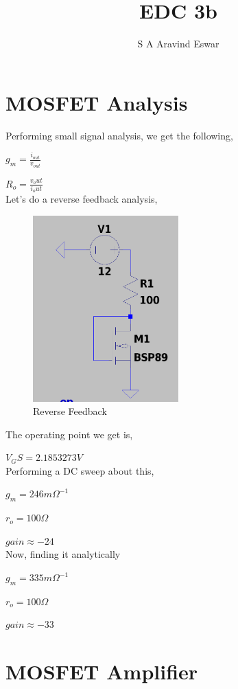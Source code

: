 \documentclass{article}
\title{EDC 3b}
\author{S A Aravind Eswar}
\begin{document}
\maketitle

\section{MOSFET Analysis}

Performing small signal analysis, we get the following,

$g_m = \frac{i_{out}}{v_{out}}$

$R_o = \frac{v_out}{i_out}$\\
Let's do a reverse feedback analysis,

\begin{figure}[H]
    \centering
    \includegraphics[width=0.5\textwidth]{ReverseFeedback.jpg}
    \caption{Reverse Feedback}
\end{figure}

The operating point we get is,

$V_GS = 2.1853273V$\\
Performing a DC sweep about this,

$g_m = 246m\Omega^{-1}$

$r_o = 100\Omega$

$gain \approx -24$\\
Now, finding it analytically

$g_m = 335m\Omega^{-1}$

$r_o = 100\Omega$

$gain \approx -33$\\
\section{MOSFET Amplifier}
\end{document}
